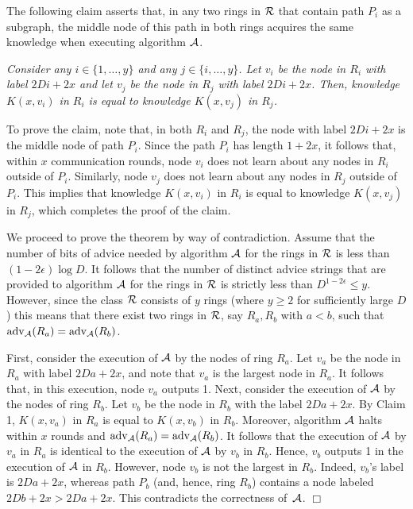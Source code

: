 \documentclass[11pt]{article}
\newcommand{\qed}{\hfill $\Box$ \bigbreak}
\newenvironment{proof}{\noindent {\bf Proof.}}{\qed}
\newcommand{\algname}{\ensuremath{{\cal A}}}
\newcommand{\advice}[1]{\ensuremath{\mathrm{adv}_{\algname}(#1)}}
\begin{document}
\begin{proof}
The following claim asserts that, in any two rings in $\cal R$ that contain path $P_i$ as a subgraph, the middle node of this path in both rings acquires the same knowledge 
when executing algorithm $\cal A$.


\vspace{3mm} 
\textit{Consider any $i \in \{1,\ldots,y\}$ and any $j \in \{i,\ldots,y\}$. Let $v_i$ be the node in $R_i$ with label $2Di+2x$ and let $v_j$ be the node in $R_j$ with label $2Di+2x$. Then, knowledge $K(x,v_i)$ in $R_i$ is equal to knowledge $K(x,v_j)$ in $R_j$.}
\vspace{3mm}

To prove the claim, note that, in both $R_i$ and $R_j$, the node with label $2Di+2x$ is the middle node of path $P_i$. Since the path $P_i$ has length $1+2x$, it follows that, within $x$ communication rounds, node $v_i$ does not learn about any nodes in $R_i$ outside of $P_i$. Similarly, node $v_j$ does not learn about any nodes in $R_j$ outside of $P_i$. This implies that knowledge $K(x,v_i)$ in $R_i$ is equal to knowledge $K(x,v_j)$ in $R_j$, which completes the proof of the claim.

We proceed to prove the theorem by way of contradiction. Assume that the number of bits of advice needed by algorithm ${\cal A}$ for the rings in ${\cal R}$ is less than $(1-2\epsilon)\log{D}$. It follows that the number of distinct advice strings that are provided to algorithm $\cal A$ for the rings in $\cal R$ is strictly less than $D^{1-2\epsilon} \leq y$. However, since the class $\cal R$ consists of $y$ rings (where $y \geq 2$ for sufficiently large $D$) this means that there exist two rings in $\cal R$, say $R_a, R_b$ with $a<b$, such that $\advice{R_a} = \advice{R_b}$.

First, consider the execution of $\cal A$ by the nodes of ring $R_a$. Let $v_a$ be the node in $R_a$ with label $2Da+2x$, and note that $v_a$ is the largest node in $R_a$. It follows that, in this execution, node $v_a$ outputs 1. Next, consider the execution of $\cal A$ by the nodes of ring $R_b$. Let $v_b$ be the node in $R_b$ with the label $2Da+2x$. By Claim 1, $K(x,v_a)$ in $R_a$ is equal to $K(x,v_b)$ in $R_b$. Moreover, 
algorithm $\cal A$ halts within $x$ rounds and $\advice{R_a} = \advice{R_b}$. It follows that the execution of $\cal A$ by $v_a$ in $R_a$ is identical to the execution of $\cal A$ by $v_b$ in $R_b$. Hence, $v_b$ outputs 1 in the execution of $\cal A$ in $R_b$. However, node $v_b$ is not the largest in $R_b$. Indeed, $v_b$'s label is $2Da+2x$, whereas path $P_b$ (and, hence, ring $R_b$) contains a node labeled $2Db+2x>2Da+2x$. This contradicts the correctness of~$\cal A$.
\end{proof}
\end{document}
